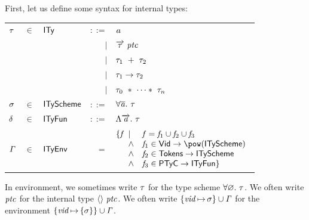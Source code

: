 \documentclass[final]{article}
\begin{document}
First, let us define some syntax for internal types:
\begin{center}
  \begin{tabular}{lllrl}
    $\mathit{\tau}$
    & $\in$
    & $\mathsf{ITy}$
    & $::=$
    & $\mathit{a}$
    \\
    &&& $\mid$
    & $\overrightarrow{\mathit{\mathit{\tau}}}\ \mathit{ptc}$
    \\
    &&& $\mid$
    & $\mathit{\tau}_1\ +\ \mathit{\tau}_2$
    \\
    &&& $\mid$
    & $\mathit{\tau}_1\rightarrow\mathit{\tau}_2$
    \\
    &&& $\mid$
    & $\mathit{\tau}_0\ *\ \cdots *\ \mathit{\tau}_n$
    \\

    $\mathit{\sigma}$
    & $\in$
    & $\mathsf{ITyScheme}$
    & $::=$
    & $\forall\overline{\mathit{\mathit{a}}}.\ \mathit{\tau}$
    \\

    $\mathit{\delta}$
    & $\in$
    & $\mathsf{ITyFun}$
    & $::=$
    & $\Lambda\overrightarrow{\mathit{\mathit{a}}}.\ \mathit{\tau}$
    \\

    $\mathit{\Gamma}$
    & $\in$
    & $\mathsf{ITyEnv}$
    & $=$
    & $\{
    \METAfun
    \begin{array}[t]{ll}
      \mid
      &
      \METAfun
      =\METAfun_1
      \cup\METAfun_2
      \cup\METAfun_3
      \\
      \wedge
      &
      \METAfun_1\in\MEMfunc{\SETvid}{\SETtoset{\SETityscheme}}
      \\
      \wedge
      &
      \METAfun_2\in\MEMfunc{\SETatoms}{\SETityscheme}
      \\
      \wedge
      &
      \METAfun_3\in\MEMfunc{\SETtycon}{\SETityfun}\}
    \end{array}$
  \end{tabular}
\end{center}


In environment, we sometimes write $\mathit{\tau}$ for the type scheme
$\forall\mathord\varnothing.\ \mathit{\tau}$.
%
We often write $\mathit{ptc}$ for the internal type
$\langle  \rangle\ \mathit{ptc}$.
%
We often write
$\{\mathit{vid}\,{\mapsto}\,\mathit{\sigma}\}\cup\mathit{\Gamma}$
for the environment
$\{\mathit{vid}\,{\mapsto}\,\{\mathit{\sigma}\}\}\cup\mathit{\Gamma}$.

\end{document}

